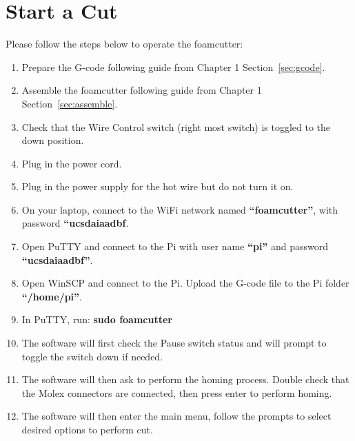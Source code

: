 \documentclass[titlepage,12pt,letter]{report}
\numberwithin{equation}{chapter}
\begin{document}
\section{Start a Cut}
Please follow the steps below to operate the foamcutter:
\begin{enumerate}[noitemsep,topsep=0pt]
	\item Prepare the G-code following guide from Chapter 1 Section~\ref{sec:gcode}.
	\item Assemble the foamcutter following guide from Chapter 1 Section~\ref{sec:assemble}.
	\item Check that the Wire Control switch (right most switch) is toggled to the down position.
	\item Plug in the power cord.
	\item Plug in the power supply for the hot wire but do not turn it on.
	\item On your laptop, connect to the WiFi network named \textbf{``foamcutter''}, with password \textbf{``ucsdaiaadbf}.
	\item Open PuTTY and connect to the Pi with user name \textbf{``pi''} and password \\ \textbf{``ucsdaiaadbf''}.
	\item Open WinSCP and connect to the Pi. Upload the G-code file to the Pi folder \\ \textbf{``/home/pi''}.
	\item In PuTTY, run: \textbf{sudo foamcutter}
	\item The software will first check the Pause switch status and will prompt to toggle the switch down if needed.
	\item The software will then ask to perform the homing process. Double check that the Molex connectors are connected, then press enter to perform homing. 
	\item The software will then enter the main menu, follow the prompts to select desired options to perform cut.
\end{enumerate}
\end{document}
